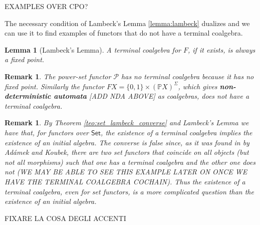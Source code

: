 \documentclass[letterpaper, 11pt, oneside]{memoir}
\theoremstyle{myteo}
\newtheorem{lemma}[theorem]{Lemma}
\newtheorem{remark}[theorem]{Remark}
\numberwithin{equation}{section}
\newcommand{\Set}{\textsf{Set}}
\begin{document}
EXAMPLES OVER CPO?

The necessary condition of Lambeck's Lemma \ref{lemma:lambeck} dualizes and we can use it to find examples of functors that do not have a terminal coalgebra.

\begin{lemma}[Lambeck's Lemma]
  A terminal coalgebra for \(F\), if it exists, is always a fixed point.
\end{lemma}

\begin{remark}
  The power-set functor \(\mathcal{P}\) has no terminal coalgebra because it has no fixed point.
  Similarly the functor \(FX = \{0, 1\} \times (\mathbb{P}X)^\Sigma\), which gives \textbf{non-deterministic automata} [ADD NDA ABOVE] as coalgebras, does not have a terminal coalgebra.
\end{remark}

\begin{remark}
  By Theorem \ref{teo:set_lambeck_converse} and Lambeck's Lemma we have that, for functors over \(\Set\), the existence of a terminal coalgebra implies the existence of an initial algebra.
  The converse is false since, as it was found in \cite[Example 3.14]{Adamek-2016} by Adámek and Koubek, there are two set functors that coincide on all objects (but not all morphisms) such that one has a terminal coalgebra and the other one does not (WE MAY BE ABLE TO SEE THIS EXAMPLE LATER ON ONCE WE HAVE THE TERMINAL COALGEBRA COCHAIN).
  Thus the existence of a terminal coalgebra, even for set functors, is a more complicated question than the existence of an initial algebra.
\end{remark}

FIXARE LA COSA DEGLI ACCENTI

\printbibliography
\end{document}
